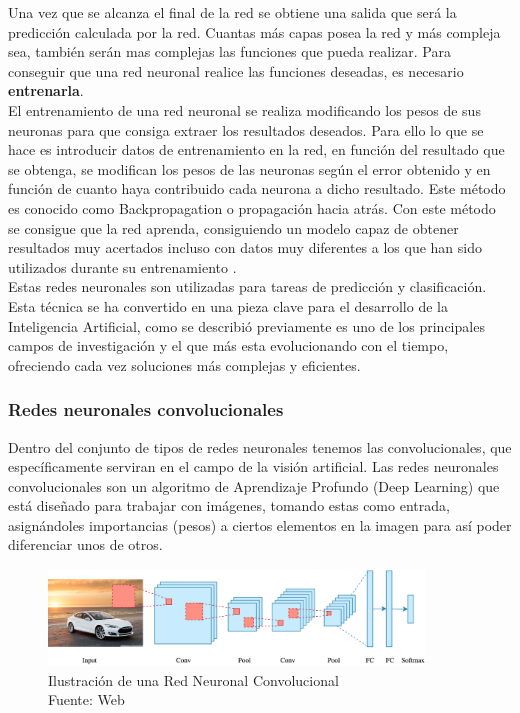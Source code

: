 Una vez que se alcanza el final de la red se obtiene una salida que será la predicción calculada por la red. Cuantas más capas posea la red y más compleja sea, también serán mas complejas las funciones que pueda realizar. Para conseguir que una red neuronal realice las funciones deseadas, es necesario \textbf{entrenarla}.\\

El entrenamiento de una red neuronal se realiza modificando los pesos de sus neuronas para que consiga extraer los resultados deseados. Para ello lo que se hace es introducir datos de entrenamiento en la red, en función del resultado que se obtenga, se modifican los pesos de las neuronas según el error obtenido y en función de cuanto haya contribuido cada neurona a dicho resultado. Este método es conocido como Backpropagation o propagación hacia atrás. Con este método se consigue que la red aprenda, consiguiendo un modelo capaz de obtener resultados muy acertados incluso con datos muy diferentes a los que han sido utilizados durante su entrenamiento \cite{atriainnovation:ia}.\\

Estas redes neuronales son utilizadas para tareas de predicción y clasificación. Esta técnica se ha convertido en una pieza clave para el desarrollo de la Inteligencia Artificial, como se describió previamente es uno de los principales campos de investigación y el que más esta evolucionando con el tiempo, ofreciendo cada vez soluciones más complejas y eficientes.

\subsubsection{Redes neuronales convolucionales}
Dentro del conjunto de tipos de redes neuronales tenemos las convolucionales, que específicamente serviran en el campo de la visión artificial. Las redes neuronales convolucionales son un algoritmo de Aprendizaje Profundo (Deep Learning) que está diseñado para trabajar con imágenes, tomando estas como entrada, asignándoles importancias (pesos) a ciertos elementos en la imagen para así poder diferenciar unos de otros.\\

\begin{figure}[H]
    \begin{center}
        \includegraphics[width=10cm]{img/capitulo_2/convolucional.png}
    \end{center}
    \caption{Ilustración de una Red Neuronal Convolucional
        \\Fuente: Web}
    \label{fig:red_neuronal_convolucional}
\end{figure}


